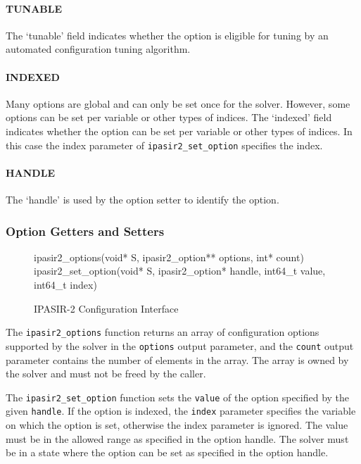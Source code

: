 \documentclass[sat]{iosart2x}
\begin{document}
\paragraph{TUNABLE}
The `tunable' field indicates whether the option is eligible for tuning by an automated configuration tuning algorithm.

\paragraph{INDEXED}
Many options are global and can only be set once for the solver.
However, some options can be set per variable or other types of indices.
The `indexed' field indicates whether the option can be set per variable or other types of indices.
In this case the index parameter of \texttt{ipasir2\_set\_option} specifies the index.

\paragraph{HANDLE}
The `handle' is used by the option setter to identify the option.

\subsubsection{Option Getters and Setters}

\begin{figure}[h]
    \tt\raggedright
    ipasir2\_options(void* S, ipasir2\_option** options, int* count)\\
    ipasir2\_set\_option(void* S, ipasir2\_option* handle, int64\_t value, int64\_t index)
    \caption{IPASIR-2 Configuration Interface}
\end{figure}

The \texttt{ipasir2\_options} function returns an array of configuration options supported by the solver in the \texttt{options} output parameter, and the \texttt{count} output parameter contains the number of elements in the array.
The array is owned by the solver and must not be freed by the caller.

The \texttt{ipasir2\_set\_option} function sets the \texttt{value} of the option specified by the given \texttt{handle}.
If the option is indexed, the \texttt{index} parameter specifies the variable on which the option is set, otherwise the index parameter is ignored.
The value must be in the allowed range as specified in the option handle.
The solver must be in a state where the option can be set as specified in the option handle.
\end{document}
